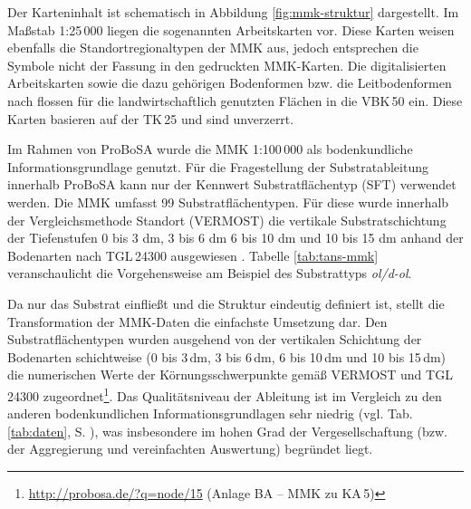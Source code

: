 Der Karteninhalt ist schematisch in Abbildung \ref{fig:mmk-struktur} dargestellt. Im Maßstab 1:25\,000 liegen die sogenannten Arbeitskarten vor. Diese Karten weisen ebenfalls die Standortregionaltypen der MMK aus, jedoch entsprechen die Symbole nicht der Fassung in den gedruckten MMK-Karten. Die digitalisierten Arbeitskarten sowie die dazu gehörigen Bodenformen bzw. die Leitbodenformen nach \citet{TGL24300} flossen für die landwirtschaftlich genutzten Flächen in die VBK\,50 ein. Diese Karten basieren auf der TK\,25 und sind unverzerrt.\



Im Rahmen von ProBoSA wurde die MMK 1:100\,000 als bodenkundliche Informationsgrundlage genutzt. Für die Fragestellung der Substratableitung innerhalb ProBoSA kann nur der Kennwert Substratflächentyp (SFT) verwendet werden. Die MMK umfasst 99 Substratflächentypen. Für diese wurde innerhalb der Vergleichsmethode Standort (VERMOST) \citep{Thiere-etal1991}  die vertikale Substratschichtung der Tiefenstufen 0 bis 3 dm, 3 bis 6 dm 6 bis 10 dm und 10 bis 15 dm anhand der Bodenarten nach TGL\,24300 ausgewiesen \citep{TGL24300}. Tabelle \ref{tab:tans-mmk} veranschaulicht die Vorgehensweise am Beispiel des Substrattyps \textit{ol/d-ol}.\


Da nur das Substrat einfließt und die Struktur eindeutig definiert ist, stellt die Transformation der MMK-Daten die einfachste Umsetzung dar. Den Substratflächentypen wurden ausgehend von der vertikalen Schichtung der Bodenarten schichtweise (0 bis 3\,dm, 3 bis 6\,dm, 6 bis 10\,dm und 10 bis 15\,dm) die numerischen Werte der Körnungsschwerpunkte gemäß VERMOST und TGL\,24300 zugeordnet\footnote{\url{http://probosa.de/?q=node/15} (Anlage BA -- MMK zu KA\,5)}. Das Qualitätsniveau der Ableitung ist im Vergleich zu den anderen bodenkundlichen Informationsgrundlagen sehr niedrig  (vgl. Tab. \ref{tab:daten}, S. \pageref{tab:daten}), was insbesondere im hohen Grad der Vergesellschaftung (bzw. der Aggregierung und vereinfachten Auswertung) begründet liegt.

